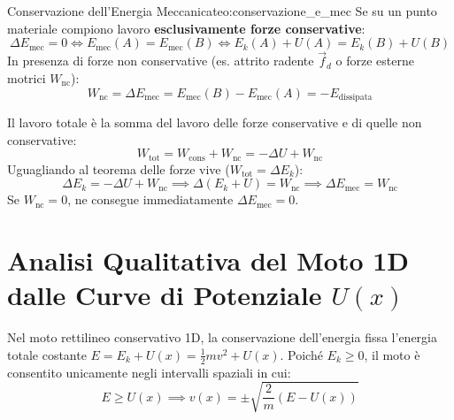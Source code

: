 \begin{teorema}{Conservazione dell'Energia Meccanica}{teo:conservazione_e_mec}
Se su un punto materiale compiono lavoro \textbf{esclusivamente forze conservative}:
\begin{equation}
    \Delta E_{\text{mec}} = 0 \iff E_{\text{mec}}(A) = E_{\text{mec}}(B) \iff E_k(A) + U(A) = E_k(B) + U(B)
    \label{eq:cons_e_mec}
\end{equation}
In presenza di forze non conservative (es. attrito radente $\vec{f}_d$ o forze esterne motrici $W_{\text{nc}}$):
\begin{equation}
    W_{\text{nc}} = \Delta E_{\text{mec}} = E_{\text{mec}}(B) - E_{\text{mec}}(A) = -E_{\text{dissipata}}
    \label{eq:bilancio_dissipativo}
\end{equation}
\end{teorema}

\begin{dimostrazione}
Il lavoro totale è la somma del lavoro delle forze conservative e di quelle non conservative:
\begin{equation}
    W_{\text{tot}} = W_{\text{cons}} + W_{\text{nc}} = -\Delta U + W_{\text{nc}}
\end{equation}
Uguagliando al teorema delle forze vive ($W_{\text{tot}} = \Delta E_k$):
\begin{equation}
    \Delta E_k = -\Delta U + W_{\text{nc}} \implies \Delta(E_k + U) = W_{\text{nc}} \implies \Delta E_{\text{mec}} = W_{\text{nc}}
\end{equation}
Se $W_{\text{nc}} = 0$, ne consegue immediatamente $\Delta E_{\text{mec}} = 0$.
\end{dimostrazione}

\section{Analisi Qualitativa del Moto 1D dalle Curve di Potenziale $U(x)$}
\label{sec:curve_potenziale}

Nel moto rettilineo conservativo 1D, la conservazione dell'energia fissa l'energia totale costante $E = E_k + U(x) = \frac{1}{2}m v^2 + U(x)$. Poiché $E_k \ge 0$, il moto è consentito unicamente negli intervalli spaziali in cui:
\begin{equation}
    E \ge U(x) \implies v(x) = \pm \sqrt{\frac{2}{m}\left(E - U(x)\right)}
\end{equation}

